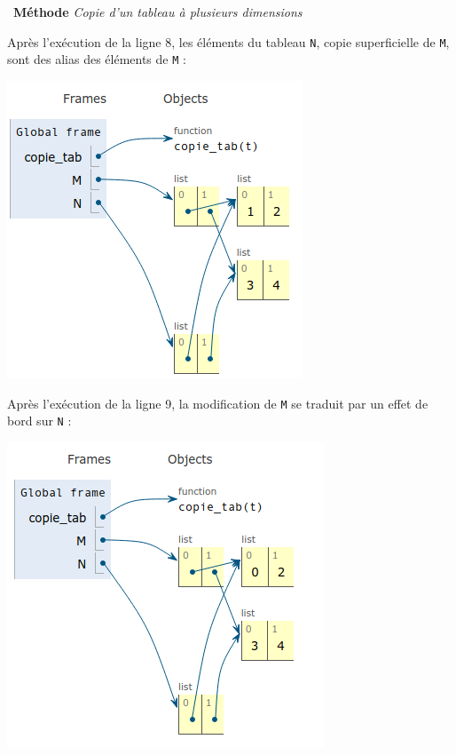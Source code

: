\documentclass[a4paper, french, 12pt]{article}
\newenvironment{methode}[1]
{\par \medskip    \noindent  
 \begin {bclogo}[arrondi =0.1,logo=\bcoutil, marge=4,noborder = true] {~\textbf{Méthode}   {\itshape #1} }  \par}
{
\end{bclogo}
 \par \bigskip }
\begin{document}
\begin{methode}{Copie d'un tableau à plusieurs dimensions}
\begin{minipage}[t]{0.45\linewidth}
Après l'exécution de la ligne 8, les éléments du tableau \texttt{N}, copie superficielle de \texttt{M}, sont des alias des éléments de \texttt{M} :
\begin{center}
\includegraphics[scale=0.6]{images/copie_tab1.png}
\end{center}
\end{minipage}
\hfill
\begin{minipage}[t]{0.45\linewidth}
Après l'exécution de la ligne 9, la modification de \texttt{M} se traduit par un effet de bord sur \texttt{N} :
\begin{center}
\includegraphics[scale=0.6]{images/copie_tab2.png}
\end{center}
\end{minipage}







\end{methode}
\end{document}
